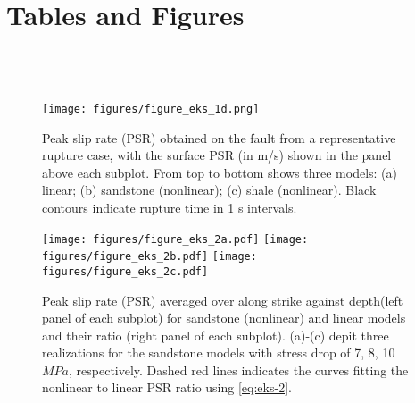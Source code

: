 \newpage
\section*{Tables and Figures}
%





{}
\begin{figure}[!ht]
     \\[\baselineskip]%
     \\[\baselineskip]%
     \\[\baselineskip]%
    \vspace{-3mm}
    \centering
    \texttt{[image: figures/figure\_eks\_1d.png]}\label{fig:eks-1d}
    \caption{Peak slip rate (PSR) obtained on the fault from a representative rupture case, with the surface PSR (in m/s) shown in the panel above each subplot. From top to bottom shows three models: (a) linear; (b) sandstone (nonlinear); (c) shale (nonlinear). Black contours indicate rupture time in 1 s intervals.}
    \label{fig:eks-1}
\end{figure}
\clearpage

\clearpage
\begin{figure}[!ht]
    \texttt{[image: figures/figure\_eks\_2a.pdf]}\label{fig:eks-2a} \hspace{0.02\textwidth}%
    \texttt{[image: figures/figure\_eks\_2b.pdf]}\label{fig:eks-2b} \hspace{0.02\textwidth}%
    \texttt{[image: figures/figure\_eks\_2c.pdf]}\label{fig:eks-2c} %
    \caption{Peak slip rate (PSR) averaged over along strike against depth(left panel of each subplot) for sandstone (nonlinear) and linear models and their ratio (right panel of each subplot). (a)-(c) depit three realizations for the sandstone models with stress drop of 7, 8, 10 $MPa$, respectively. Dashed red lines indicates the curves fitting the nonlinear to linear PSR ratio using \cref{eq:eks-2}.}
    \label{fig:eks-2}
\end{figure}
\clearpage


